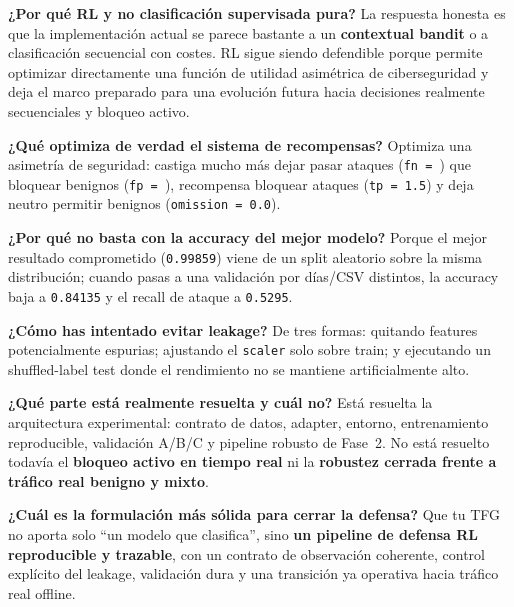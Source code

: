 ﻿\documentclass[12pt,a4paper]{article}
\begin{document}
\textbf{¿Por qué RL y no clasificación supervisada pura?}
La respuesta honesta es que la implementación actual se parece bastante a un \textbf{contextual
bandit} o a clasificación secuencial con costes. RL sigue siendo defendible porque permite optimizar
directamente una función de utilidad asimétrica de ciberseguridad y deja el marco preparado para una
evolución futura hacia decisiones realmente secuenciales y bloqueo activo.

\textbf{¿Qué optimiza de verdad el sistema de recompensas?}
Optimiza una asimetría de seguridad: castiga mucho más dejar pasar ataques (\texttt{fn~=~}) que
bloquear benignos (\texttt{fp~=~}), recompensa bloquear ataques (\texttt{tp~=~1.5}) y deja
neutro permitir benignos (\texttt{omission~=~0.0}).

\textbf{¿Por qué no basta con la accuracy del mejor modelo?}
Porque el mejor resultado comprometido (\texttt{0.99859}) viene de un split aleatorio sobre la misma
distribución; cuando pasas a una validación por días/CSV distintos, la accuracy baja a
\texttt{0.84135} y el recall de ataque a \texttt{0.5295}.

\textbf{¿Cómo has intentado evitar leakage?}
De tres formas: quitando features potencialmente espurias; ajustando el \texttt{scaler} solo sobre
train; y ejecutando un shuffled-label test donde el rendimiento no se mantiene artificialmente alto.

\textbf{¿Qué parte está realmente resuelta y cuál no?}
Está resuelta la arquitectura experimental: contrato de datos, adapter, entorno, entrenamiento
reproducible, validación A/B/C y pipeline robusto de Fase~2. No está resuelto todavía el
\textbf{bloqueo activo en tiempo real} ni la \textbf{robustez cerrada frente a tráfico real benigno
y mixto}.

\textbf{¿Cuál es la formulación más sólida para cerrar la defensa?}
Que tu TFG no aporta solo ``un modelo que clasifica'', sino \textbf{un pipeline de defensa RL
reproducible y trazable}, con un contrato de observación coherente, control explícito del leakage,
validación dura y una transición ya operativa hacia tráfico real offline.
\end{document}
